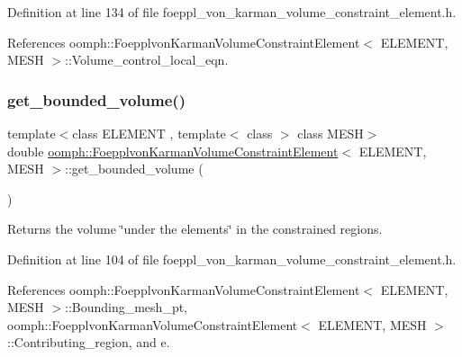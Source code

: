 Definition at line 134 of file foeppl\+\_\+von\+\_\+karman\+\_\+volume\+\_\+constraint\+\_\+element.\+h.



References oomph\+::\+Foepplvon\+Karman\+Volume\+Constraint\+Element$<$ E\+L\+E\+M\+E\+N\+T, M\+E\+S\+H $>$\+::\+Volume\+\_\+control\+\_\+local\+\_\+eqn.

\mbox{\label{classoomph_1_1FoepplvonKarmanVolumeConstraintElement_a0323cc351bcaf25dfc1830b78601541a}} 
\subsubsection{\texorpdfstring{get\+\_\+bounded\+\_\+volume()}{get\_bounded\_volume()}}
{\footnotesize\ttfamily template$<$class E\+L\+E\+M\+E\+NT , template$<$ class $>$ class M\+E\+SH$>$ \\
double \hyperlink{classoomph_1_1FoepplvonKarmanVolumeConstraintElement}{oomph\+::\+Foepplvon\+Karman\+Volume\+Constraint\+Element}$<$ E\+L\+E\+M\+E\+NT, M\+E\+SH $>$\+::get\+\_\+bounded\+\_\+volume (\begin{DoxyParamCaption}{ }\end{DoxyParamCaption})\hspace{0.3cm}{\ttfamily [inline]}}



Returns the volume \char`\"{}under the elements\char`\"{} in the constrained regions. 



Definition at line 104 of file foeppl\+\_\+von\+\_\+karman\+\_\+volume\+\_\+constraint\+\_\+element.\+h.



References oomph\+::\+Foepplvon\+Karman\+Volume\+Constraint\+Element$<$ E\+L\+E\+M\+E\+N\+T, M\+E\+S\+H $>$\+::\+Bounding\+\_\+mesh\+\_\+pt, oomph\+::\+Foepplvon\+Karman\+Volume\+Constraint\+Element$<$ E\+L\+E\+M\+E\+N\+T, M\+E\+S\+H $>$\+::\+Contributing\+\_\+region, and e.

\mbox{\label{classoomph_1_1FoepplvonKarmanVolumeConstraintElement_ae7d433867de128ccc2f01b304b87b1b6}} 
